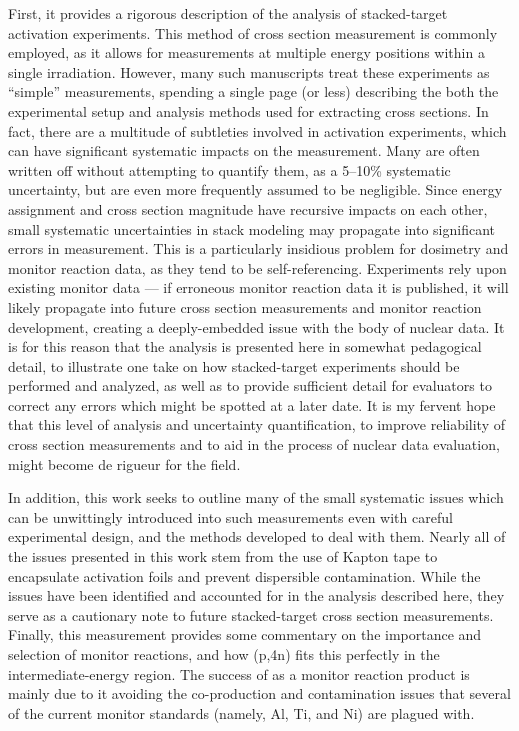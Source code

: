 First, it provides a rigorous  description of the analysis of stacked-target activation experiments.
This method of cross section measurement is commonly employed, as it allows for measurements at multiple energy positions within a single irradiation.
However, many such manuscripts treat these experiments as \enquote{simple} measurements, spending a single page (or less) describing the both the experimental setup and analysis methods used for extracting cross sections.
In fact, there are a multitude of subtleties involved in activation experiments, which can have significant systematic impacts on the measurement.
Many  are often written off without attempting to quantify them, as a 5--10\% systematic uncertainty, but are even more frequently assumed to be negligible. 
Since energy assignment and cross section magnitude have recursive impacts on each other, small systematic uncertainties in stack modeling may 
propagate into significant errors in measurement.
This is a particularly insidious problem for dosimetry and monitor reaction data, as they tend to be self-referencing.
Experiments rely upon existing monitor data --- if erroneous monitor reaction data it is published, it will likely propagate into future cross section measurements and monitor reaction development, creating a deeply-embedded issue with the body of nuclear data.
It is for this reason that the analysis is presented here in somewhat pedagogical detail, to illustrate one take on how stacked-target experiments should be performed and analyzed, as well as to provide sufficient detail for evaluators to correct any errors which might be spotted at a later date.
It is my fervent hope that this level of analysis and uncertainty quantification, to improve reliability of cross section measurements and to aid in the process of nuclear data evaluation, might become  de rigueur for the field.


In addition, this work seeks to outline many of the small systematic issues which can be unwittingly introduced into such measurements even with careful experimental design, and the methods developed to deal with them.
Nearly all of the issues presented in this work stem from the use of Kapton tape to encapsulate activation foils and prevent dispersible contamination.
While the issues have been identified and accounted for in the analysis described here, they serve as a cautionary note to future stacked-target cross section measurements.
Finally, this measurement provides some commentary on the importance and selection of monitor reactions, and how (p,4n) fits this perfectly in the intermediate-energy region.
The success of  as a monitor reaction product is mainly due to it avoiding the co-production and contamination issues that several of the current monitor standards (namely, Al, Ti, and Ni) are plagued with.




